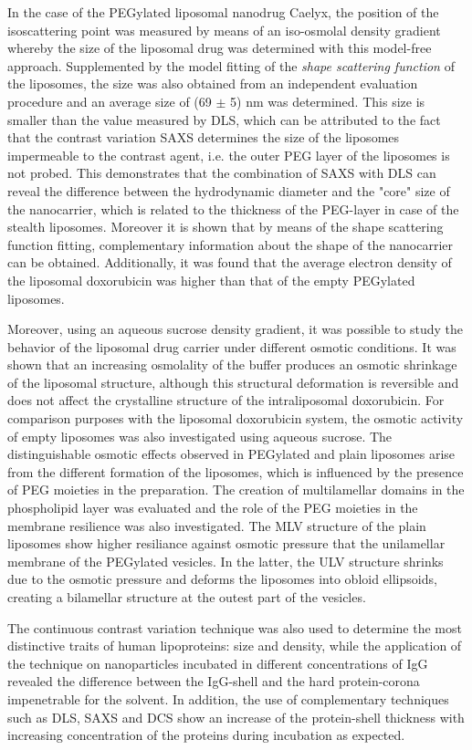In the case of the PEGylated liposomal nanodrug Caelyx, the position of the isoscattering point was measured by means of an iso-osmolal density gradient whereby the size of the liposomal drug was determined with this model-free approach. Supplemented by the model fitting of the \emph{shape scattering function} of the liposomes, the size was also obtained from an independent evaluation procedure and an average size of (69 $\pm$ 5) nm was determined. This size is smaller than the value measured by DLS, which can be attributed to the fact that the contrast variation SAXS determines the size of the liposomes impermeable to the contrast agent, i.e. the outer PEG layer of the liposomes is not probed. This demonstrates that the combination of SAXS with DLS can reveal the difference between the hydrodynamic diameter and the "core" size of the nanocarrier, which is related to the thickness of the PEG-layer in case of the stealth liposomes. Moreover it is shown that by means of the shape scattering function fitting, complementary information about the shape of the nanocarrier can be obtained. Additionally, it was found that the average electron density of the liposomal doxorubicin was higher than that of the empty PEGylated liposomes.

Moreover, using an aqueous sucrose density gradient, it was possible to study the behavior of the liposomal drug carrier under different osmotic conditions. It was shown that an increasing osmolality of the buffer produces an osmotic shrinkage of the liposomal structure, although this structural deformation is reversible and does not affect the crystalline structure of the intraliposomal doxorubicin. For comparison purposes with the liposomal doxorubicin system, the osmotic activity of empty liposomes was also investigated using aqueous sucrose. The distinguishable osmotic effects observed in PEGylated and plain liposomes arise from the different formation of the liposomes, which is influenced by the presence of PEG moieties in the preparation. The creation of multilamellar domains in the phospholipid layer was evaluated and the role of the PEG moieties in the membrane resilience was also investigated. The MLV structure of the plain liposomes show higher resiliance against osmotic pressure that the unilamellar membrane of the PEGylated vesicles. In the latter, the ULV structure shrinks due to the osmotic pressure and deforms the liposomes into obloid ellipsoids, creating a bilamellar structure at the outest part of the vesicles.

The continuous contrast variation technique was also used to determine the most distinctive traits of human lipoproteins: size and density, while the application of the technique on nanoparticles incubated in different concentrations of IgG revealed the difference between the IgG-shell and the hard protein-corona impenetrable for the solvent. In addition, the use of complementary techniques such as DLS, SAXS and DCS show an increase of the protein-shell thickness with increasing concentration of the proteins during incubation as expected.

